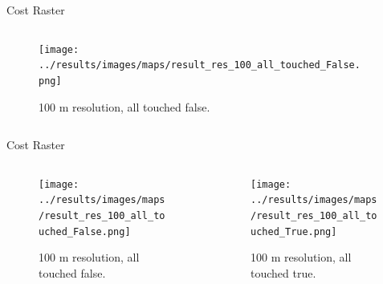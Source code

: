 \documentclass[usenames,dvipsnames,aspectratio=169]{beamer}
\begin{document}
\begin{frame}{Cost Raster}
	\begin{columns}[T] %
		\begin{column}{.48\textwidth}
			\begin{figure}[htb]
				\texttt{[image: ../results/images/maps/result\_res\_100\_all\_touched\_False.png]}
				\caption{100 m resolution, all touched false.}
			\end{figure}
		\end{column}
		\begin{column}{.48\textwidth}
			
		\end{column}
	\end{columns}
\end{frame}

\begin{frame}{Cost Raster}
	\begin{columns}[T] %
		\begin{column}{.48\textwidth}
			\begin{figure}[htb]
				\texttt{[image: ../results/images/maps/result\_res\_100\_all\_touched\_False.png]}
				\caption{100 m resolution, all touched false.}
			\end{figure}
		\end{column}
		\begin{column}{.48\textwidth}
			\begin{figure}[htb]
				\texttt{[image: ../results/images/maps/result\_res\_100\_all\_touched\_True.png]}
				\caption{100 m resolution, all touched true.}
			\end{figure}
		\end{column}
	\end{columns}
\end{frame}

\end{document}
